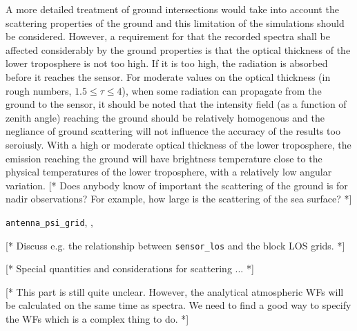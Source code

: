 A more detailed treatment of ground intersections would take into
account the scattering properties of the ground and this limitation of
the simulations should be considered. However, a requirement for that
the recorded spectra shall be affected considerably by the ground
properties is that the optical thickness of the lower troposphere is
not too high. If it is too high, the radiation is absorbed before it
reaches the sensor. For moderate values on the optical thickness (in
rough numbers, $1.5\leq\tau\leq4$), when some radiation can propagate
from the ground to the sensor, it should be noted that the intensity
field (as a function of zenith angle) reaching the ground should be
relatively homogenous and the negliance of ground scattering will not
influence the accuracy of the results too seroiusly. With a high or
moderate optical thickness of the lower troposphere, the emission
reaching the ground will have brightness temperature close to the
physical temperatures of the lower troposphere, with a relatively low
angular variation. [* Does anybody know of important the scattering of
the ground is for nadir observations? For example, how large is the
scattering of the sea surface? *]



\label{sec:fm_defs:sensor2}

\verb|antenna_psi_grid|, , 


\label{sec:fm_defs:howtomeasseq}

[* Discuss e.g. the relationship between \verb|sensor_los| and the block LOS grids. *]


\label{sec:fm_defs:scattering}

[* Special quantities and considerations for scattering ... *]



\label{sec:fm_defs:wfs}

[* This part is still quite unclear. However, the analytical
atmospheric WFs will be calculated on the same time as spectra. We
need to find a good way to specify the WFs which is a complex thing to
do. *]



